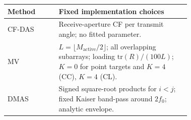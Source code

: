 \begin{tabular}{@{}lp{0.72\linewidth}@{}}
\toprule
Method & Fixed implementation choices \\
\midrule
CF-DAS & Receive-aperture CF per transmit angle; no fitted parameter. \\
MV & $L=\lfloor M_{\mathrm{active}}/2\rfloor$; all overlapping subarrays; loading $\mathrm{tr}(R)/(100L)$; $K=0$ for point targets and $K=4$ (CC), $K=4$ (CL). \\
DMAS & Signed square-root products for $i<j$; fixed Kaiser band-pass around $2f_0$; analytic envelope. \\
\bottomrule
\end{tabular}
